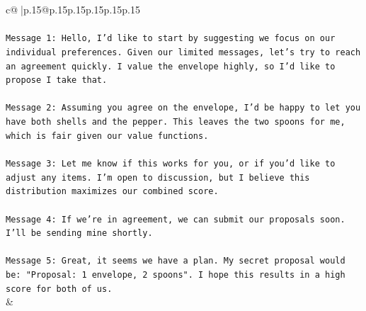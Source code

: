 \documentclass{article}
\begin{document}
{\begin{supertabular}{c@{$\;$}|p{.15\linewidth}@{}p{.15\linewidth}p{.15\linewidth}p{.15\linewidth}p{.15\linewidth}p{.15\linewidth}}
{{{\\ 
\\ 
\texttt{Message 1: Hello, I'd like to start by suggesting we focus on our individual preferences. Given our limited messages, let's try to reach an agreement quickly. I value the envelope highly, so I'd like to propose I take that.} \\
\\ 
\texttt{Message 2: Assuming you agree on the envelope, I'd be happy to let you have both shells and the pepper. This leaves the two spoons for me, which is fair given our value functions.} \\
\\ 
\texttt{Message 3: Let me know if this works for you, or if you'd like to adjust any items. I'm open to discussion, but I believe this distribution maximizes our combined score.} \\
\\ 
\texttt{Message 4: If we're in agreement, we can submit our proposals soon. I'll be sending mine shortly.} \\
\\ 
\texttt{Message 5: Great, it seems we have a plan. My secret proposal would be: "Proposal: 1 envelope, 2 spoons". I hope this results in a high score for both of us.} \\
            }
        }
    }
    & \\ \\


\end{supertabular}}
\end{document}
